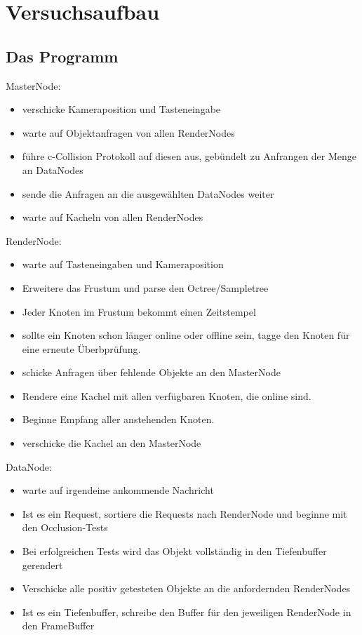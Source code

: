 \chapter{Versuchsaufbau}
\section{Das Programm}

\label{masternode}
MasterNode:
\begin{itemize}
 \item verschicke Kameraposition und Tasteneingabe
 \item warte auf Objektanfragen von allen RenderNodes
 \item führe c-Collision Protokoll auf diesen aus, gebündelt zu Anfrangen der Menge an DataNodes
 \item sende die Anfragen an die ausgewählten DataNodes weiter
 \item warte auf Kacheln von allen RenderNodes
\end{itemize}

\label{rendernode}
RenderNode:
\begin{itemize}
 \item warte auf Tasteneingaben und Kameraposition
 \item Erweitere das Frustum und parse den Octree/Sampletree
 \item Jeder Knoten im Frustum bekommt einen Zeitstempel
 \item sollte ein Knoten schon länger online oder offline sein, tagge den Knoten für eine erneute Überbprüfung.
 \item schicke Anfragen über fehlende Objekte an den MasterNode
 \item Rendere eine Kachel mit allen verfügbaren Knoten, die online sind.
 \item Beginne Empfang aller anstehenden Knoten.
 \item verschicke die Kachel an den MasterNode
\end{itemize}

\label{datanode}
DataNode:
\begin{itemize}
 \item warte auf irgendeine ankommende Nachricht
 \item Ist es ein Request, sortiere die Requests nach RenderNode und beginne mit den Occlusion-Tests
 \item Bei erfolgreichen Tests wird das Objekt vollständig in den Tiefenbuffer gerendert
 \item Verschicke alle positiv getesteten Objekte an die anfordernden RenderNodes
 \item Ist es ein Tiefenbuffer, schreibe den Buffer für den jeweiligen RenderNode in den FrameBuffer
\end{itemize}

